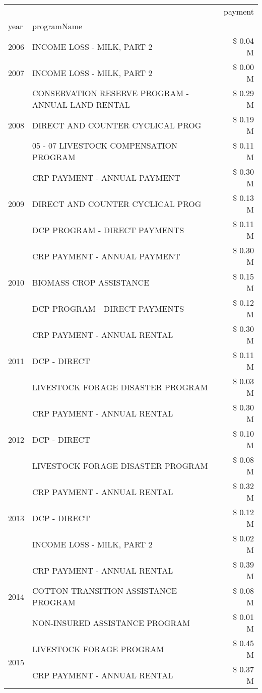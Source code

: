 \begin{tabular}{llr}
\toprule
 &  & payment \\
year & programName &  \\
\midrule
2006 & INCOME LOSS - MILK, PART 2 & \$ 0.04 M \\
\cline{1-3}
2007 & INCOME LOSS - MILK, PART 2 & \$ 0.00 M \\
\cline{1-3}
\multirow[t]{3}{*}{2008} & CONSERVATION RESERVE PROGRAM - ANNUAL LAND RENTAL & \$ 0.29 M \\
 & DIRECT AND COUNTER CYCLICAL PROG & \$ 0.19 M \\
 & 05 - 07 LIVESTOCK COMPENSATION PROGRAM & \$ 0.11 M \\
\cline{1-3}
\multirow[t]{3}{*}{2009} & CRP PAYMENT - ANNUAL PAYMENT & \$ 0.30 M \\
 & DIRECT AND COUNTER CYCLICAL PROG & \$ 0.13 M \\
 & DCP PROGRAM - DIRECT PAYMENTS & \$ 0.11 M \\
\cline{1-3}
\multirow[t]{3}{*}{2010} & CRP PAYMENT - ANNUAL PAYMENT & \$ 0.30 M \\
 & BIOMASS CROP ASSISTANCE & \$ 0.15 M \\
 & DCP PROGRAM - DIRECT PAYMENTS & \$ 0.12 M \\
\cline{1-3}
\multirow[t]{3}{*}{2011} & CRP PAYMENT - ANNUAL RENTAL & \$ 0.30 M \\
 & DCP - DIRECT & \$ 0.11 M \\
 & LIVESTOCK FORAGE DISASTER PROGRAM & \$ 0.03 M \\
\cline{1-3}
\multirow[t]{3}{*}{2012} & CRP PAYMENT - ANNUAL RENTAL & \$ 0.30 M \\
 & DCP - DIRECT & \$ 0.10 M \\
 & LIVESTOCK FORAGE DISASTER PROGRAM & \$ 0.08 M \\
\cline{1-3}
\multirow[t]{3}{*}{2013} & CRP PAYMENT - ANNUAL RENTAL & \$ 0.32 M \\
 & DCP - DIRECT & \$ 0.12 M \\
 & INCOME LOSS - MILK, PART 2 & \$ 0.02 M \\
\cline{1-3}
\multirow[t]{3}{*}{2014} & CRP PAYMENT - ANNUAL RENTAL & \$ 0.39 M \\
 & COTTON TRANSITION ASSISTANCE PROGRAM & \$ 0.08 M \\
 & NON-INSURED ASSISTANCE PROGRAM & \$ 0.01 M \\
\cline{1-3}
\multirow[t]{3}{*}{2015} & LIVESTOCK FORAGE PROGRAM & \$ 0.45 M \\
 & CRP PAYMENT - ANNUAL RENTAL & \$ 0.37 M \\

\end{tabular}
